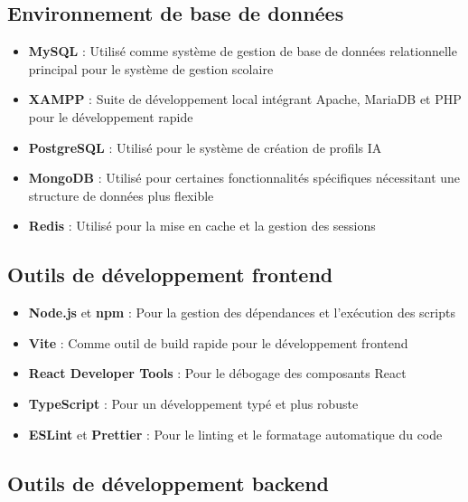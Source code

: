 \subsection{Environnement de base de données}

\begin{itemize}
  \item \textbf{MySQL} : Utilisé comme système de gestion de base de données relationnelle principal pour le système de gestion scolaire
  
  \item \textbf{XAMPP} : Suite de développement local intégrant Apache, MariaDB et PHP pour le développement rapide
  
  \item \textbf{PostgreSQL} : Utilisé pour le système de création de profils IA
  
  \item \textbf{MongoDB} : Utilisé pour certaines fonctionnalités spécifiques nécessitant une structure de données plus flexible
  
  \item \textbf{Redis} : Utilisé pour la mise en cache et la gestion des sessions
\end{itemize}

\subsection{Outils de développement frontend}

\begin{itemize}
  \item \textbf{Node.js} et \textbf{npm} : Pour la gestion des dépendances et l'exécution des scripts
  
  \item \textbf{Vite} : Comme outil de build rapide pour le développement frontend
  
  \item \textbf{React Developer Tools} : Pour le débogage des composants React
  
  \item \textbf{TypeScript} : Pour un développement typé et plus robuste
  
  \item \textbf{ESLint} et \textbf{Prettier} : Pour le linting et le formatage automatique du code
\end{itemize}

\subsection{Outils de développement backend}

